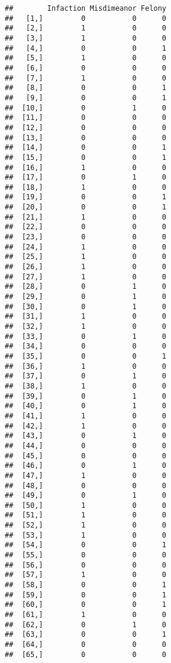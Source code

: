 \documentclass[
]{article}
\begin{document}
\begin{verbatim}
##        Infaction Misdimeanor Felony
##   [1,]         0           0      0
##   [2,]         1           0      0
##   [3,]         1           0      0
##   [4,]         0           0      1
##   [5,]         1           0      0
##   [6,]         0           0      0
##   [7,]         1           0      0
##   [8,]         0           0      1
##   [9,]         0           0      1
##  [10,]         0           1      0
##  [11,]         0           0      0
##  [12,]         0           0      0
##  [13,]         0           0      0
##  [14,]         0           0      1
##  [15,]         0           0      1
##  [16,]         1           0      0
##  [17,]         0           1      0
##  [18,]         1           0      0
##  [19,]         0           0      1
##  [20,]         0           0      1
##  [21,]         1           0      0
##  [22,]         0           0      0
##  [23,]         0           0      0
##  [24,]         1           0      0
##  [25,]         1           0      0
##  [26,]         1           0      0
##  [27,]         1           0      0
##  [28,]         0           1      0
##  [29,]         0           1      0
##  [30,]         0           1      0
##  [31,]         1           0      0
##  [32,]         1           0      0
##  [33,]         0           1      0
##  [34,]         0           0      0
##  [35,]         0           0      1
##  [36,]         1           0      0
##  [37,]         0           1      0
##  [38,]         1           0      0
##  [39,]         0           1      0
##  [40,]         0           1      0
##  [41,]         1           0      0
##  [42,]         1           0      0
##  [43,]         0           1      0
##  [44,]         0           0      0
##  [45,]         0           0      0
##  [46,]         0           1      0
##  [47,]         1           0      0
##  [48,]         0           0      0
##  [49,]         0           1      0
##  [50,]         1           0      0
##  [51,]         1           0      0
##  [52,]         1           0      0
##  [53,]         1           0      0
##  [54,]         0           0      1
##  [55,]         0           0      0
##  [56,]         0           0      0
##  [57,]         1           0      0
##  [58,]         0           0      1
##  [59,]         0           0      1
##  [60,]         0           0      1
##  [61,]         1           0      0
##  [62,]         0           1      0
##  [63,]         0           0      1
##  [64,]         0           0      0
##  [65,]         0           0      0

\end{verbatim}
\end{document}
